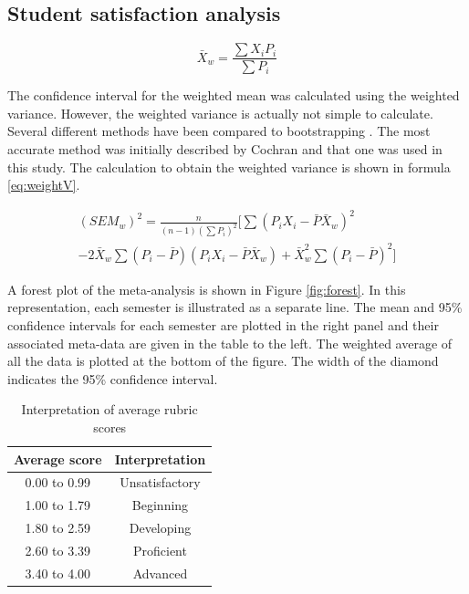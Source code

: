 \documentclass[fleqn,10pt]{SelfArx}\usepackage[]{graphicx}\usepackage[]{color}
\begin{document}
\subsection{Student satisfaction analysis}
\begin{equation}
\bar{X}_w = \frac{\sum X_i P_i}{\sum P_i}
\label{eq:weightX}
\end{equation}

The confidence interval for the weighted mean was calculated using the weighted variance. However, the weighted variance is actually not simple to calculate. Several different methods have been compared to bootstrapping \citep{Gatz1995a}. The most accurate method was initially described by Cochran \citep{Cochran1977} and that one was used in this study. The calculation to obtain the weighted variance is shown in formula \ref{eq:weightV}.

\begin{equation}
\begin{split}
(SEM_w)^2 = \frac{n}{(n-1)(\sum P_i)^2}\big[ \sum(P_i X_i - \bar{P}\bar{X}_w)^2 \\
- 2\bar{X}_w \sum(P_i - \bar{P})(P_i X_ i - \bar{P} \bar{X}_w) + \bar{X}_w^2 \sum(P_i - \bar{P})^2 \big]
\label{eq:weightV}
\end{split}
\end{equation}




A forest plot of the meta-analysis is shown in Figure \ref{fig:forest}. In this representation, each semester is illustrated as a separate line. The mean and 95\% confidence intervals for each semester are plotted in the right panel and their associated meta-data are given in the table to the left. The weighted average of all the data is plotted at the bottom of the figure. The width of the diamond indicates the 95\% confidence interval.


\begin{table}[hbt]
\caption{Interpretation of average rubric scores}
\centering
\begin{tabular}{c c}
\textbf{Average score} & \textbf{Interpretation}   \\
\hline
0.00 to 0.99   &   Unsatisfactory                                \\
1.00 to 1.79   &   Beginning                                     \\
1.80 to 2.59   &   Developing                                    \\
2.60 to 3.39   &   Proficient                                    \\
3.40 to 4.00   &   Advanced                                      \\
\end{tabular}
\label{tab:regions}
\end{table}
\end{document}
